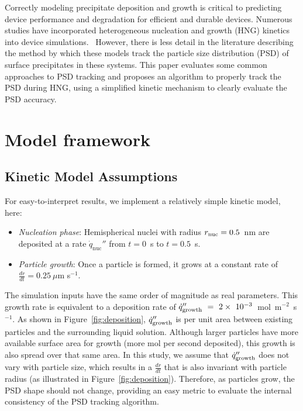 \documentclass[final,3p,times,twocolumn, 12pt]{elsarticle}
\begin{document}
Correctly modeling precipitate deposition and  growth is critical to predicting device performance and degradation for efficient and durable devices. Numerous studies have incorporated heterogeneous nucleation and growth (HNG) kinetics into device simulations.~\cite{bib:Model_ex_1,bib:Model_ex_2,bib:Model_ex_3,bib:Model_ex_4,bib:Model_ex_5,bib:Model_ex_6, bib:Model_ex_7, bib:Model_ex_8,bib:Model_ex_9, bib:Model_ex_10} However, there is less detail in the literature describing the method by which these models track the particle size distribution (PSD) of surface precipitates in these systems. This paper evaluates some common approaches to PSD tracking and proposes an algorithm to properly track the PSD during HNG, using a simplified kinetic mechanism to clearly evaluate the PSD accuracy. 

\section{Model framework}
\label{sect:model-framework}
\subsection{Kinetic Model Assumptions}
For easy-to-interpret results, we implement a relatively simple kinetic model, here:
\begin{itemize}
    \item \emph{Nucleation phase}: Hemispherical nuclei with radius $r_{\rm nuc}=0.5$~nm are deposited at a rate $\dot{q}_\mathrm{nuc}''$ from $t = 0$~s to $t = 0.5$~s.
    \item \emph{Particle growth}: Once a particle is formed, it grows at a constant rate of $\frac{dr}{dt} = 0.25~\mu$m s$^{-1}$.
\end{itemize}
The simulation inputs have the same order of magnitude as real parameters. This growth rate is equivalent to a deposition rate of $\dot{q}_{\rm growth}^{\prime\prime}~=~2\times~10^{-3}$~mol~m$^{-2}$~s$^{-1}$. As shown in Figure~\ref{fig:deposition}, $\dot{q}_{\rm growth}^{\prime\prime}$ is per unit area between existing particles and the surrounding liquid solution. Although larger particles have more available surface area for growth (more mol per second deposited), this growth is also spread over that same area. In this study, we assume that $\dot{q}_{\rm growth}^{\prime\prime}$ does not vary with particle size, which results in a $\frac{dr}{dt}$ that is also invariant with particle radius (as illustrated in Figure~\ref{fig:deposition}). Therefore, as particles grow, the PSD shape should not change, providing an easy metric to evaluate the internal consistency of the PSD tracking algorithm.
\end{document}
